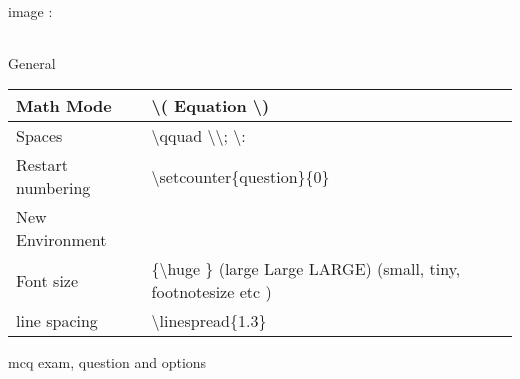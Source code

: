 \begin{enumerate}
     \begin{minipage}{\linewidth}
     \item image :

          \begin{myTableStyle} \begin{tabular}{ |m{14cm}| } \hline
               \\ \hline
          \end{tabular} \end{myTableStyle} \vspace{0.08in}
     \end{minipage}

     \item   General

          \begin{myTableStyle} \begin{tabular}{ |m{4cm}|m{10cm}| } \hline
               Math Mode    &  \textbackslash ( Equation \textbackslash ) \\ \hline
               Spaces  & \textbackslash qquad  \qquad \textbackslash \qquad \textbackslash ; \qquad \textbackslash : \\ \hline

               Restart numbering &  \textbackslash setcounter\{question\}\{0\} \\ \hline

               New Environment &   \\ \hline

               Font size &  \{\textbackslash huge \}   (large Large LARGE) (small, tiny, footnotesize etc ) \\ \hline

               line spacing & \textbackslash linespread\{1.3\} \\ \hline
          \end{tabular} \end{myTableStyle} \vspace{0.08in}

     \item mcq exam, question and options

          \begin{myTableStyle} \begin{tabular}{ |m{14cm}| } \hline
                \\ \hline
          \end{tabular} \end{myTableStyle} \vspace{0.08in}

\end{enumerate}
